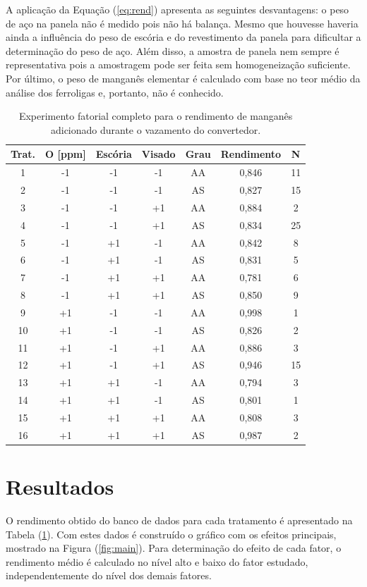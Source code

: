 		A aplicação da Equação (\ref{eq:rend}) apresenta as seguintes desvantagens: o peso de aço na panela não é medido pois não há balança. Mesmo que houvesse haveria ainda a influência do peso de escória e do revestimento da panela para dificultar a determinação do peso de aço. Além disso, a amostra de panela nem sempre é representativa pois a amostragem pode ser feita sem  homogeneização suficiente. Por último, o peso de manganês elementar é calculado com base no teor médio da análise dos ferroligas e, portanto, não é conhecido. 		
		\begin{table}[H]
		\caption{Experimento fatorial completo para o rendimento de manganês adicionado durante o vazamento do convertedor.}
		\label{tab:doe}
			\begin{footnotesize}
			\begin{tabular}[c]{ccccccc}
				\hline
				Trat. & O [ppm] & Escória & Visado & Grau & Rendimento & N \\
				\hline \hline	
				1 & -1 & -1 & -1 & AA & 0,846 & 11   \\
				2 & -1 & -1 & -1 & AS & 0,827 & 15   \\
				3 & -1 & -1 & +1 & AA & 0,884 & 2    \\
				4 & -1 & -1 & +1 & AS & 0,834 & 25   \\
				5 & -1 & +1 & -1 & AA & 0,842 & 8    \\
				6 & -1 & +1 & -1 & AS & 0,831 & 5    \\
				7 & -1 & +1 & +1 & AA & 0,781 & 6    \\
				8 & -1 & +1 & +1 & AS & 0,850 & 9    \\
				9 & +1 & -1 & -1 & AA & 0,998 & 1    \\
				10& +1 & -1 & -1 & AS & 0,826 & 2    \\
				11& +1 & -1 & +1 & AA & 0,886 & 3    \\
				12& +1 & -1 & +1 & AS & 0,946 & 15   \\
				13& +1 & +1 & -1 & AA & 0,794 & 3    \\
				14& +1 & +1 & -1 & AS & 0,801 & 1    \\
				15& +1 & +1 & +1 & AA & 0,808 & 3    \\
				16& +1 & +1 & +1 & AS & 0,987 & 2    \\
				\hline
			\end{tabular}
			\end{footnotesize}
		\end{table}		
\section{Resultados}
		O rendimento obtido do banco de dados para cada tratamento é apresentado na Tabela (\ref{tab:doe}). Com estes dados é construído o gráfico com os efeitos principais, mostrado na Figura (\ref{fig:main}). Para determinação do efeito de cada fator, o rendimento médio é calculado no nível alto e baixo do fator estudado, independentemente do nível dos demais fatores. 
		
